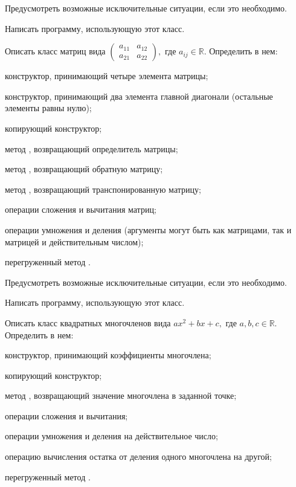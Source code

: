 Предусмотреть возможные исключительные ситуации, если это необходимо.

Написать программу, использующую этот класс.

\task Описать класс  матриц вида $\begin{pmatrix}
  a_{11} & a_{12} \\
  a_{21} & a_{22}
\end{pmatrix},$ где $a_{ij} \in \mathbb{R}$. Определить в нем:
\begin{itemize*}
\item конструктор, принимающий четыре элемента матрицы;
\item конструктор, принимающий два элемента главной диагонали
  (остальные элементы равны нулю);
\item копирующий конструктор;
\item метод , возвращающий определитель матрицы;
\item метод , возвращающий обратную матрицу;
\item метод , возвращающий транспонированную матрицу;
\item операции сложения и вычитания матриц;
\item операции умножения и деления (аргументы могут быть как матрицами,
  так и матрицей и действительным числом);
\item перегруженный метод .
\end{itemize*}

Предусмотреть возможные исключительные ситуации, если это необходимо.

Написать программу, использующую этот класс.

\task Описать класс  квадратных многочленов вида
$ax^2+bx+c,$ где $a,b,c \in \mathbb{R}$. Определить в нем:
\begin{itemize*}
\item конструктор, принимающий коэффициенты многочлена;
\item копирующий конструктор;
\item метод , возвращающий значение многочлена в заданной
  точке;
\item операции сложения и вычитания;
\item операции умножения и деления на действительное число;
\item операцию вычисления остатка от деления одного многочлена на
  другой;
\item перегруженный метод .
\end{itemize*}

